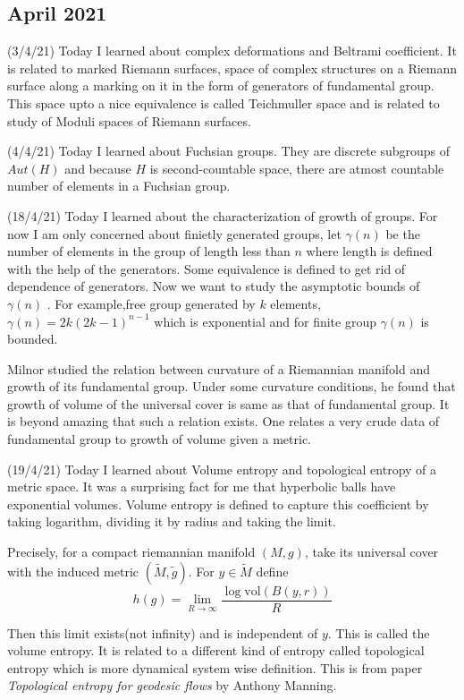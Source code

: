 \documentclass[12pt,a4paper]{article}
\begin{document}
 
 \subsection*{April 2021}
 
 
 \quad (3/4/21) Today I learned about complex deformations and Beltrami coefficient. It is related to marked Riemann surfaces, space of complex structures on a Riemann surface along a marking on it in the form of generators of fundamental group. This space upto a nice equivalence is called Teichmuller space and is related to study of Moduli spaces of Riemann surfaces.
 
 (4/4/21) Today I learned about Fuchsian groups. They are discrete subgroups of $Aut(H)$ and because $H$ is second-countable space, there are atmost countable number of elements in a Fuchsian group.
 
 (18/4/21) Today I learned about the characterization of growth of groups. For now I am only concerned about finietly generated groups, let $\gamma(n)$ be the  number of elements in the group of length less than $n$ where length is defined with the help of the generators. Some equivalence is defined to get rid of dependence of generators. Now we want to study the asymptotic bounds of $\gamma(n)$ . For example,free group generated by $k$ elements, $\gamma(n) = 2k(2k-1)^{n-1}$ which is exponential and for finite group $\gamma(n)$ is bounded.
 
 Milnor studied the relation between curvature of a Riemannian manifold and growth of its fundamental group. Under some curvature conditions, he found that growth of volume of the universal cover is same as that of fundamental group. It is beyond amazing that such a relation exists. One relates a very crude data of fundamental group to growth of volume given a metric.
 
 (19/4/21) Today I learned about Volume entropy and topological entropy of a metric space. It was a surprising fact for me that hyperbolic balls have exponential volumes. Volume entropy is defined to capture this coefficient by taking logarithm, dividing it by radius and taking the limit.
 
  Precisely, for a compact riemannian manifold $(M,g)$, take its universal cover with the induced metric $(\tilde{M},\tilde{g})$. For $y \in \tilde{M}$ define 
  \[ h(g) = \lim_{R \to \infty} \frac{\log \text{vol}(B(y,r))}{R} \]
  
  Then this limit exists(not infinity) and is independent of $y$. This is called the volume entropy. It is related to a different kind of entropy called topological entropy which is more dynamical system wise definition. This is from paper \textit{Topological entropy for geodesic flows} by Anthony Manning.
  
\end{document}
